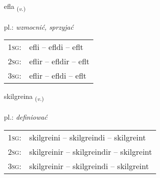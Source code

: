 \documentclass[frontgrid, backgrid]{flacards}\usepackage[]{graphicx}\usepackage[]{xcolor}
\begin{document}
\renewcommand{\flhead}{\vskip5pt \fboxsep=0pt {\small\bfseries\footnotesize Sagnorð | czasownik}}
\renewcommand{\fcfoot}{\vskip5pt \fboxsep=0pt \hspace{2pt}{\small\bfseries\footnotesize 1K}}

\renewcommand{\blhead}{\vskip5pt {\small\bfseries\footnotesize Sagnorð | czasownik }}
\renewcommand{\bcfoot}{\vskip5pt \hspace{2pt}{\small\bfseries\footnotesize 1K}}


{efla \small{\textsubscript{(\textit{v.})}} \\[1ex] %
\textphonetic{[ɛpla]} \\
pl.: \emph{wzmocnić, sprzyjać} \\  [2ex]
\renewcommand*{\arraystretch}{0.8}
\begin{tabular}{p{1cm}l}
\textsc{1sg}: & efli -- efldi -- eflt \\ 
\textsc{2sg}: & eflir -- efldir -- eflt \\ 
\textsc{3sg}: & eflir -- efldi -- eflt \\ 
\end{tabular}
}

\renewcommand{\flhead}{\vskip5pt \fboxsep=0pt {\small\bfseries\footnotesize Sagnorð | czasownik}}
\renewcommand{\fcfoot}{\vskip5pt \fboxsep=0pt \hspace{2pt}{\small\bfseries\footnotesize 1K}}

\renewcommand{\blhead}{\vskip5pt {\small\bfseries\footnotesize Sagnorð | czasownik }}
\renewcommand{\bcfoot}{\vskip5pt \hspace{2pt}{\small\bfseries\footnotesize 1K}}


{skilgreina \small{\textsubscript{(\textit{v.})}} \\[1ex] %
\textphonetic{[scɪlkreina]} \\
pl.: \emph{definiować} \\  [2ex]
\renewcommand*{\arraystretch}{0.8}
\begin{tabular}{p{1cm}l}
\textsc{1sg}: & skilgreini -- skilgreindi -- skilgreint \\ 
\textsc{2sg}: & skilgreinir -- skilgreindir -- skilgreint \\ 
\textsc{3sg}: & skilgreinir -- skilgreindi -- skilgreint \\ 
\end{tabular}
}
\end{document}
